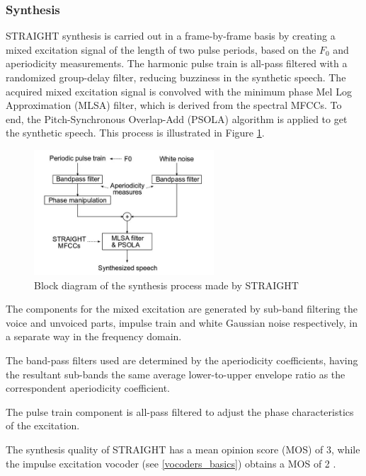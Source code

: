 \subsubsection{Synthesis}
\label{vocoders_straight_synthesis}
STRAIGHT synthesis is carried out in a frame-by-frame basis by creating a mixed excitation signal of the length of two pulse periods, based on the $F_{0}$ and aperiodicity measurements.
%
The harmonic pulse train is all-pass filtered with a randomized group-delay filter, reducing buzziness in the synthetic speech.
%
The acquired mixed excitation signal is convolved with the minimum phase Mel Log Approximation (MLSA) filter, which is derived from the spectral MFCCs.
%
To end, the Pitch-Synchronous Overlap-Add (PSOLA) algorithm \cite{moulines1990pitch} is applied to get the synthetic speech.
%
This process is illustrated in Figure \ref{fig:straight_synthesis}.

\begin{figure}[!htb]
\begin{centering}
\includegraphics[width=0.6\textwidth]{images/straight_synthesis.jpg}
\caption{Block diagram of the synthesis process made by STRAIGHT \cite{manuMSc}}
\label{fig:straight_synthesis}
\end{centering}
\end{figure}

The components for the mixed excitation are generated by sub-band filtering the voice and unvoiced parts, impulse train and white Gaussian noise respectively, in a separate way in the frequency domain.

The band-pass filters used are determined by the aperiodicity coefficients, having the resultant sub-bands the same average lower-to-upper envelope ratio as the correspondent aperiodicity coefficient.

The pulse train component is all-pass filtered to adjust the phase characteristics of the excitation.

The synthesis quality of STRAIGHT has a mean opinion score (MOS) of 3, while the impulse excitation vocoder (see \ref{vocoders_basics}) obtains a MOS of 2 \cite{karhila_jstsp_14}.